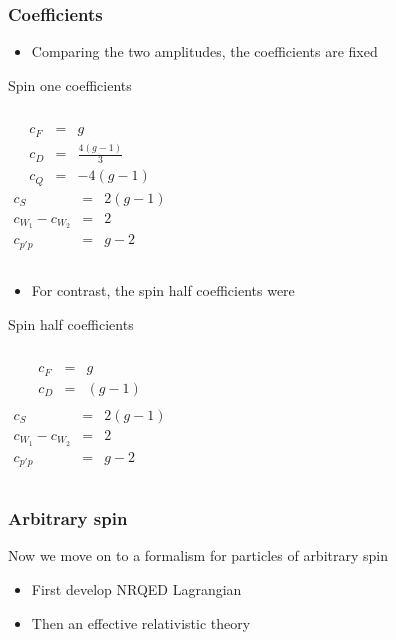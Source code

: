 \documentclass[11ppt]{beamer}
\newcommand{\beqa}{\begin{eqnarray*} }
\newcommand{\eeqa}{\end{eqnarray*} }
\newcommand{\Sitem}[1]{ \begin{itemize} \item #1 \end{itemize} }
\begin{document}
\begin{frame}
\frametitle{Coefficients}

\Sitem{Comparing the two amplitudes, the coefficients are fixed}

\begin{block}{Spin one coefficients}
\begin{columns}[l]
\column{.5 in}
\beqa
	c_F &=& g \\
	c_D &=&	\frac{4(g-1)}{3} 	\\
	c_Q &=&	-4 (g-1)	
\eeqa
\column{1 in}
\beqa
	c_S &=& 2(g-1)	\\
	c_{W_1}- c_{W_2} &=& 2	\\
	c_{p'p}	&=&  g-2	
\eeqa
\end{columns}
\end{block}
\pause
\Sitem{	For contrast, the spin half coefficients were}

\begin{block}{Spin half coefficients}
\begin{columns}[l]
\column{.5 in}
\beqa
	c_F &=& g \\
	c_D &=&	(g-1) 	\\
\eeqa
\column{1 in}
\beqa
	c_S &=& 2(g-1)	\\
	c_{W_1}- c_{W_2} &=& 2	\\
	c_{p'p}	&=&  g-2	
\eeqa
\end{columns}
	\end{block}
\end{frame}


\begin{frame}
\frametitle{Arbitrary spin}
Now we move on to a formalism for particles of arbitrary spin
\begin{itemize}
  \item First develop NRQED Lagrangian
  \item Then an effective relativistic theory
\end{itemize}
\end{frame}
\end{document}
